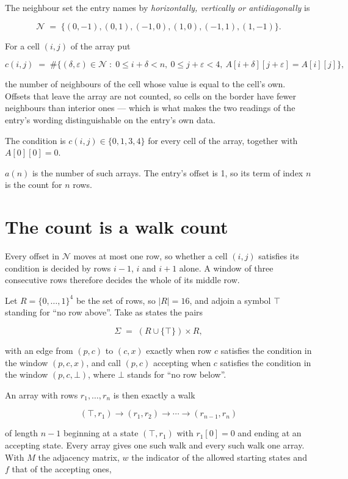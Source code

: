 \documentclass[11pt]{article}
\theoremstyle{definition}
\begin{document}
The neighbour set the entry names by {\itshape horizontally, vertically or antidiagonally} is

\[\mathcal{N} \;=\; \{(0,-1), (0,1), (-1,0), (1,0), (-1,1), (1,-1)\}.\]

For a cell $(i,j)$ of the array put

\[c(i,j) \;=\; \#\bigl\{(\delta,\varepsilon)\in\mathcal{N} \;:\; 0\le i+\delta<n,\ 0\le j+\varepsilon<4,\ A[i+\delta][j+\varepsilon] = A[i][j]\bigr\},\]

the number of neighbours of the cell whose value is equal to the cell's own. Offsets that leave the array are not counted, so cells on the border have fewer neighbours than interior ones --- which is what makes the two readings of the entry's wording distinguishable on the entry's own data.

The condition is $c(i,j) \in \{0, 1, 3, 4\}$ for every cell of the array, together with $A[0][0]=0$.

$a(n)$ is the number of such arrays. The entry's offset is 1, so its term of index $n$ is the count for $n$ rows.

\section{The count is a walk count}

Every offset in $\mathcal{N}$ moves at most one row, so whether a cell $(i,j)$ satisfies its condition is decided by rows $i-1$, $i$ and $i+1$ alone. A window of three consecutive rows therefore decides the whole of its middle row.

Let $R = \{0,\dots,1\}^{4}$ be the set of rows, so $|R| = 16$, and adjoin a symbol $\top$ standing for ``no row above''. Take as states the pairs

\[\Sigma \;=\; (R \cup \{\top\}) \times R,\]

with an edge from $(p,c)$ to $(c,x)$ exactly when row $c$ satisfies the condition in the window $(p,c,x)$, and call $(p,c)$ accepting when $c$ satisfies the condition in the window $(p,c,\bot)$, where $\bot$ stands for ``no row below''.

An array with rows $r_1,\dots,r_n$ is then exactly a walk

\[(\top,r_1) \to (r_1,r_2) \to \cdots \to (r_{n-1},r_n)\]

of length $n-1$ beginning at a state $(\top,r_1)$ with $r_1[0]=0$ and ending at an accepting state. Every array gives one such walk and every such walk one array. With $M$ the adjacency matrix, $w$ the indicator of the allowed starting states and $f$ that of the accepting ones,
\end{document}
